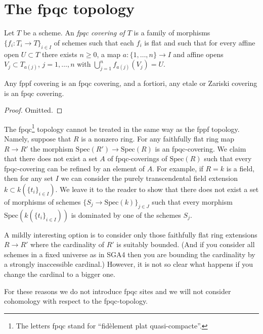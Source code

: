 \section{The fpqc topology}
\label{section-fpqc}

\begin{definition}
\label{definition-fpqc-covering}
Let $T$ be a scheme. An {\it fpqc
covering of $T$} is a family
of morphisms $\{f_i : T_i \to T\}_{i \in I}$ of schemes
such that each $f_i$ is flat and such that for every affine open
$U \subset T$ there exists $n \geq 0$, a map
$a : \{1, \ldots, n\} \to I$ and affine opens
$V_j \subset T_{a(j)}$, $j = 1, \ldots, n$
with $\bigcup_{j = 1}^n f_{a(j)}(V_j) = U$.
\end{definition}

\begin{lemma}
\label{lemma-zariski-etale-fppf-fpqc}
Any fppf covering is an fpqc covering, and a fortiori,
any etale or Zariski covering is an fpqc covering.
\end{lemma}

\begin{proof}
Omitted.
\end{proof}

\noindent
The fpqc\footnote{The letters fpqc stand for
``fid\`element plat quasi-compacte''.}
topology cannot be treated in the same way as the fppf topology.
Namely, suppose that $R$ is a nonzero ring. For any faithfully flat
ring map $R \to R'$ the morphism $\text{Spec}(R') \to \text{Spec}(R)$
is an fpqc-covering. We claim that there does not exist a set $A$ of
fpqc-coverings of $\text{Spec}(R)$ such that every fpqc-covering can
be refined by an element of $A$. For example, if $R = k$ is a field,
then for any set $I$ we can consider the purely transcendental field extension
$k \subset k(\{t_i\}_{i \in I})$. We leave it to the reader to show
that there does not exist a set of morphisms of schemes
$\{S_j \to \text{Spec}(k)\}_{j \in J}$ such that every morphism
$\text{Spec}(k(\{t_i\}_{i \in I}))$ is dominated by one of
the schemes $S_j$.

\medskip\noindent
A mildly interesting option is to consider only those faithfully flat ring
extensions $R \to R'$ where the cardinality of $R'$ is suitably bounded.
(And if you consider all schemes in a fixed universe as in SGA4 then you
are bounding the cardinality by a strongly inaccessible cardinal.)
However, it is not so clear what happens if you change the cardinal
to a bigger one.

\medskip\noindent
For these reasons we do not introduce fpqc sites and we will not consider
cohomology with respect to the fpqc-topology.


